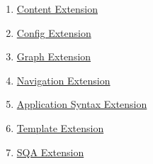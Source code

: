 \begin{enumerate}
\item 
\par \hyperref[content-extension]{Content Extension} 
\item 
\par \hyperref[config-extension]{Config Extension} 
\item 
\par \hyperref[graph-extension]{Graph Extension} 
\item 
\par \hyperref[navigation-extension]{Navigation Extension} 
\item 
\par \hyperref[application-syntax-extension]{Application Syntax Extension} 
\item 
\par \hyperref[template-extension]{Template Extension} 
\item 
\par \hyperref[sqa-extension]{SQA Extension}
\end{enumerate}
